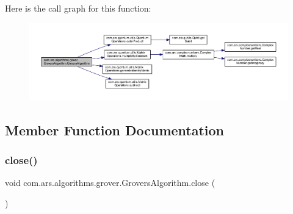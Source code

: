 Here is the call graph for this function\+:\nopagebreak
\begin{figure}[H]
\begin{center}
\leavevmode
\includegraphics[width=350pt]{classcom_1_1ars_1_1algorithms_1_1grover_1_1_grovers_algorithm_acd86694e5d961a9e964a5dc439677738_cgraph}
\end{center}
\end{figure}


\subsection{Member Function Documentation}
\hypertarget{classcom_1_1ars_1_1algorithms_1_1grover_1_1_grovers_algorithm_a0df6e611d65aed02934b95df8414fac0}{}\label{classcom_1_1ars_1_1algorithms_1_1grover_1_1_grovers_algorithm_a0df6e611d65aed02934b95df8414fac0} 
\subsubsection{\texorpdfstring{close()}{close()}}
{\footnotesize\ttfamily void com.\+ars.\+algorithms.\+grover.\+Grovers\+Algorithm.\+close (\begin{DoxyParamCaption}{ }\end{DoxyParamCaption})}

